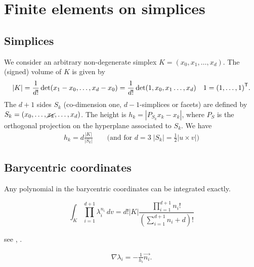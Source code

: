 %
\section{Finite elements on simplices}\label{sec:}
%
%
\subsection{Simplices}\label{subsec:}
%
We consider an arbitrary non-degenerate simplex $K=(x_0,x_1,\ldots, x_{d})$. The (signed) volume of $K$ is given by
%
\begin{equation}\label{eq:}
|K| = \frac{1}{d!} \det(x_1-x_{0},\ldots, x_{d}-x_{0})= \frac{1}{d!} \det(1,x_{0},x_1\ldots, x_{d})\quad 1={(1,\ldots,1)}^{\mathsf{T}}.
\end{equation}
%
The $d+1$ sides $S_k$ (co-dimension one, $d-1$-simplices or facets) are defined by
$S_k=(x_0,\ldots, \cancel{x_k}, \ldots, x_{d})$. The height is $h_k=|P_{S_k}x_k - x_k|$, where $P_S$ is the orthogonal projection on the hyperplane associated to $S_k$. We have
%
\begin{align*}
h_k = d\frac{|K|}{|S_k|} \qquad\mbox{(and for $d=3 \; |S_k| = \frac12 |u\times v| $)}
\end{align*}
%
%
\subsection{Barycentric coordinates}\label{subsec:}
%
%
Any polynomial in the barycentric coordinates can be integrated exactly.
%
\begin{yellow}[Integration on $K$]
\begin{equation}\label{eq:}
\int_K \prod_{i=1}^{d+1}\lambda_i^{n_i} \,dv = d!|K|\frac{\prod\limits_{i=1}^{d+1} n_i!}{\left( \sum\limits_{i=1}^{d+1} n_i + d\right)!}
\end{equation}
\end{yellow}
%
see \cite{EisenbergMalvern73}, \cite{VermolenSegal18}.
%
%
\begin{yellow}
\begin{align*}
\nabla \lambda_i = - \frac{1}{h_i}\vec{n_i}. 
\end{align*}
\end{yellow}
%
%
